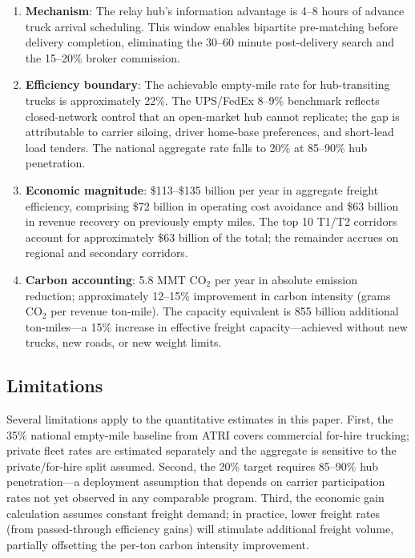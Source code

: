 \begin{enumerate}
  \item \textbf{Mechanism}: The relay hub's information advantage is 4--8 hours of advance truck arrival scheduling. This window enables bipartite pre-matching before delivery completion, eliminating the 30--60 minute post-delivery search and the 15--20\% broker commission.

  \item \textbf{Efficiency boundary}: The achievable empty-mile rate for hub-transiting trucks is approximately 22\%. The UPS/FedEx 8--9\% benchmark reflects closed-network control that an open-market hub cannot replicate; the gap is attributable to carrier siloing, driver home-base preferences, and short-lead load tenders. The national aggregate rate falls to 20\% at 85--90\% hub penetration.

  \item \textbf{Economic magnitude}: \$113--\$135 billion per year in aggregate freight efficiency, comprising \$72 billion in operating cost avoidance and \$63 billion in revenue recovery on previously empty miles. The top 10 T1/T2 corridors account for approximately \$63 billion of the total; the remainder accrues on regional and secondary corridors.

  \item \textbf{Carbon accounting}: 5.8 MMT CO$_2$ per year in absolute emission reduction; approximately 12--15\% improvement in carbon intensity (grams CO$_2$ per revenue ton-mile). The capacity equivalent is 855 billion additional ton-miles---a 15\% increase in effective freight capacity---achieved without new trucks, new roads, or new weight limits.
\end{enumerate}

\subsection{Limitations}

Several limitations apply to the quantitative estimates in this paper. First, the 35\% national empty-mile baseline from ATRI \citep{ATRI_costs2024} covers commercial for-hire trucking; private fleet rates are estimated separately and the aggregate is sensitive to the private/for-hire split assumed. Second, the 20\% target requires 85--90\% hub penetration---a deployment assumption that depends on carrier participation rates not yet observed in any comparable program. Third, the economic gain calculation assumes constant freight demand; in practice, lower freight rates (from passed-through efficiency gains) will stimulate additional freight volume, partially offsetting the per-ton carbon intensity improvement.

